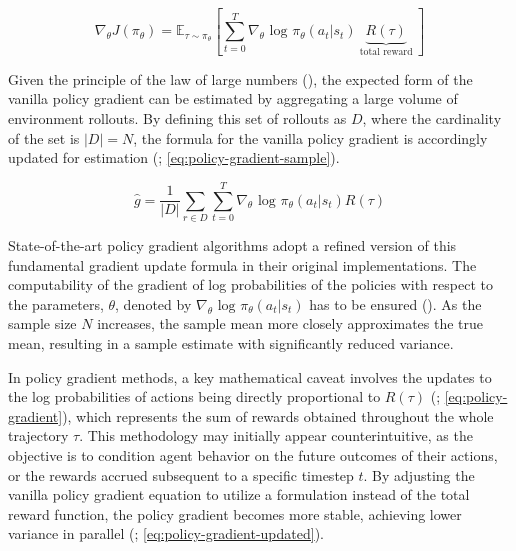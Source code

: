 \begin{equation}
    \nabla_{\theta}J(\pi_{\theta}) = \mathbb{E}_{\tau \sim \pi_{\theta}} \left[ \sum_{t=0}^{T} \nabla_{\theta} \text{ log } \pi_{\theta}(a_t | s_t) \underbrace{R(\tau)}_{\text{ total reward }}\right]
    \label{eq:policy-gradient}
\end{equation}



\noindent Given the principle of the law of large numbers (\textcolor{deepblue}{\cite{Athreya2006}}), the expected form of the vanilla policy gradient can be estimated by aggregating a large volume of environment rollouts. By defining this set of rollouts as $D$, where the cardinality of the set is $|D| = N$, the formula for the vanilla policy gradient is accordingly updated for estimation (\textcolor{deepblue}{\cite{SpinningUp2018}; \autoref{eq:policy-gradient-sample}}).

\begin{equation}
    \hat{g} = \frac{1}{|D|} \sum_{r \in D} \sum_{t=0}^{T} \nabla_{\theta} \text{ log } \pi_{\theta}(a_t | s_t) R(\tau)
    \label{eq:policy-gradient-sample}
\end{equation}

\noindent State-of-the-art policy gradient algorithms adopt a refined version of this fundamental gradient update formula in their original implementations. The computability of the gradient of log probabilities of the policies with respect to the parameters, $\theta$, denoted by $\nabla_{\theta} \text{ log } \pi_{\theta}(a_t | s_t)$ has to be ensured (\textcolor{deepblue}{\cite{SpinningUp2018}}). As the sample size $N$ increases, the sample mean more closely approximates the true mean, resulting in a sample estimate with significantly reduced variance.

\bigskip


\noindent In policy gradient methods, a key mathematical caveat involves the updates to the log probabilities of actions being directly proportional to $R(\tau)$ (\textcolor{deepblue}{\cite{SpinningUp2018}; \autoref{eq:policy-gradient}}), which represents the sum of rewards obtained throughout the whole trajectory $\tau$. This methodology may initially appear counterintuitive, as the objective is to condition agent behavior on the future outcomes of their actions, or the rewards accrued subsequent to a specific timestep $t$. By adjusting the vanilla policy gradient equation to utilize a  formulation instead of the total reward function, the policy gradient becomes more stable, achieving lower variance in parallel (\textcolor{deepblue}{\cite{SpinningUp2018}; \autoref{eq:policy-gradient-updated}}).

